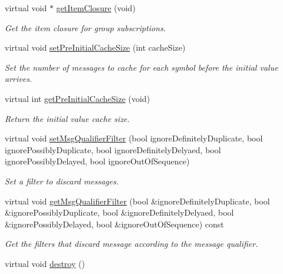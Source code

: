 \begin{DoxyCompactItemize}
virtual void $\ast$ \hyperlink{classWombat_1_1MamaSubscription_a24e2f328324ade72834cb96fe445bc24}{getItemClosure} (void)
\begin{DoxyCompactList}\small\item\em Get the item closure for group subscriptions. \item\end{DoxyCompactList}\item 
virtual void \hyperlink{classWombat_1_1MamaSubscription_ab377b043417b8e6544d677b4ad141b77}{setPreInitialCacheSize} (int cacheSize)
\begin{DoxyCompactList}\small\item\em Set the number of messages to cache for each symbol before the initial value arrives. \item\end{DoxyCompactList}\item 
virtual int \hyperlink{classWombat_1_1MamaSubscription_af9cffd081567024fc88e97c1011e0dc7}{getPreInitialCacheSize} (void)
\begin{DoxyCompactList}\small\item\em Return the initial value cache size. \item\end{DoxyCompactList}\item 
virtual void \hyperlink{classWombat_1_1MamaSubscription_a47002cfff7b77554fca3065ff2356bbe}{setMsgQualifierFilter} (bool ignoreDefinitelyDuplicate, bool ignorePossiblyDuplicate, bool ignoreDefinitelyDelyaed, bool ignorePossiblyDelayed, bool ignoreOutOfSequence)
\begin{DoxyCompactList}\small\item\em Set a filter to discard messages. \item\end{DoxyCompactList}\item 
virtual void \hyperlink{classWombat_1_1MamaSubscription_acde88c025386448c58ee5db4393a08d6}{getMsgQualifierFilter} (bool \&ignoreDefinitelyDuplicate, bool \&ignorePossiblyDuplicate, bool \&ignoreDefinitelyDelyaed, bool \&ignorePossiblyDelayed, bool \&ignoreOutOfSequence) const 
\begin{DoxyCompactList}\small\item\em Get the filters that discard message according to the message qualifier. \item\end{DoxyCompactList}\item 
virtual void \hyperlink{classWombat_1_1MamaSubscription_a331eee861f0185e564bcceac3aedde24}{destroy} ()

\end{DoxyCompactItemize}
